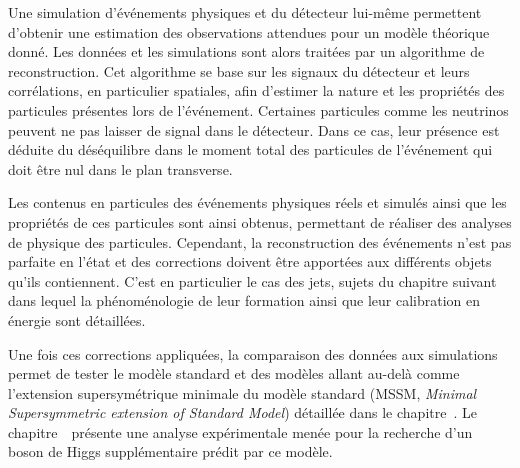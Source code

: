 \par Une simulation d'événements physiques et du détecteur lui-même permettent d'obtenir une estimation des observations attendues pour un modèle théorique donné.
Les données et les simulations sont alors traitées par un algorithme de reconstruction.
Cet algorithme se base sur les signaux du détecteur et leurs corrélations, en particulier spatiales, afin d'estimer la nature et les propriétés des particules présentes lors de l'événement.
Certaines particules comme les neutrinos peuvent ne pas laisser de signal dans le détecteur.
Dans ce cas, leur présence est déduite du déséquilibre dans le moment total des particules de l'événement qui doit être nul dans le plan transverse.
\par Les contenus en particules des événements physiques réels et simulés ainsi que les propriétés de ces particules sont ainsi obtenus, permettant de réaliser des analyses de physique des particules.
Cependant, la reconstruction des événements n'est pas parfaite en l'état et des corrections doivent être apportées aux différents objets qu'ils contiennent.
C'est en particulier le cas des jets, sujets du chapitre suivant dans lequel la phénoménologie de leur formation ainsi que leur calibration en énergie sont détaillées.
\par Une fois ces corrections appliquées, la comparaison des données aux simulations permet de tester le modèle standard et des modèles allant au-delà comme l'extension supersymétrique minimale du modèle standard (MSSM, \emph{Minimal Supersymmetric extension of Standard Model}) détaillée dans le chapitre~.
Le chapitre~\ présente une analyse expérimentale menée pour la recherche d'un boson de Higgs supplémentaire prédit par ce modèle.